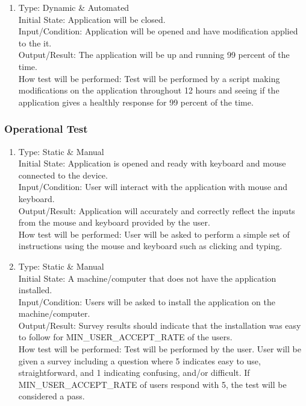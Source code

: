 \documentclass[12pt, titlepage]{article}
\begin{document}
\begin{adjustwidth}{2.2em}{0pt}
\begin{enumerate}[{NF-PT}1.]
    \item Type: Dynamic \& Automated\\
    Initial State: Application will be closed.\\
    Input/Condition: Application will be opened and have modification applied to the it.\\
    Output/Result: The application will be up and running 99 percent of the time.\\
    How test will be performed: Test will be performed by a script making modifications on the application throughout 12 hours and seeing if the application gives a healthly response for 99 percent of the time.
\end{enumerate}
\end{adjustwidth}

\subsubsection{Operational Test}

\begin{adjustwidth}{2.2em}{0pt}
\begin{enumerate}[{NF-OT}1.]
    \item Type: Static \& Manual\\
    Initial State: Application is opened and ready with keyboard and mouse connected to the device.\\
    Input/Condition: User will interact with the application with mouse and keyboard.\\
    Output/Result: Application will accurately and correctly reflect the inputs from the mouse and keyboard provided by the user.\\
    How test will be performed: User will be asked to perform a simple set of instructions using the mouse and keyboard such as clicking and typing.
    
    \item Type: Static \& Manual\\
    Initial State: A machine/computer that does not have the application installed.\\
    Input/Condition: Users will be asked to install the application on the machine/computer.\\
    Output/Result: Survey results should indicate that the installation was easy to follow for MIN\_USER\_ACCEPT\_RATE of the users.\\
    How test will be performed: Test will be performed by the user. User will be given a survey including a question where 5 indicates easy to use, straightforward, and 1 indicating confusing, and/or difficult. If MIN\_USER\_ACCEPT\_RATE of users respond with 5, 
    the test will be considered a pass.
\end{enumerate}
\end{adjustwidth}
\end{document}

